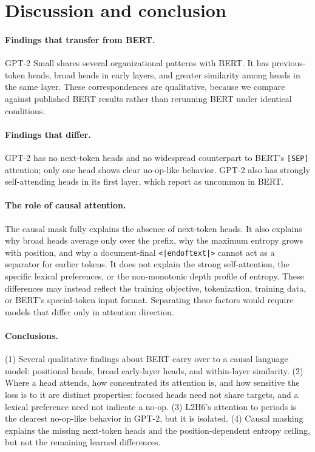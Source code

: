 \documentclass{article}
\newcommand{\SEP}{\texttt{[SEP]}}
\newcommand{\eot}{\texttt{<|endoftext|>}}
\begin{document}
\section{Discussion and conclusion}
\label{sec:discussion}

\paragraph{Findings that transfer from BERT.} GPT-2 Small shares several organizational patterns with BERT. It has previous-token heads, broad heads in early layers, and greater similarity among heads in the same layer. These correspondences are qualitative, because we compare against published BERT results rather than rerunning BERT under identical conditions.

\paragraph{Findings that differ.} GPT-2 has no next-token heads and no widespread counterpart to BERT's \SEP{} attention; only one head shows clear no-op-like behavior. GPT-2 also has strongly self-attending heads in its first layer, which \citeauthor{clark2019} report as uncommon in BERT.

\paragraph{The role of causal attention.} The causal mask fully explains the absence of next-token heads. It also explains why broad heads average only over the prefix, why the maximum entropy grows with position, and why a document-final \eot{} cannot act as a separator for earlier tokens. It does not explain the strong self-attention, the specific lexical preferences, or the non-monotonic depth profile of entropy. These differences may instead reflect the training objective, tokenization, training data, or BERT's special-token input format. Separating these factors would require models that differ only in attention direction.

\paragraph{Conclusions.} (1) Several qualitative findings about BERT carry over to a causal language model: positional heads, broad early-layer heads, and within-layer similarity. (2) Where a head attends, how concentrated its attention is, and how sensitive the loss is to it are distinct properties: focused heads need not share targets, and a lexical preference need not indicate a no-op. (3) L2H6's attention to periods is the clearest no-op-like behavior in GPT-2, but it is isolated. (4) Causal masking explains the missing next-token heads and the position-dependent entropy ceiling, but not the remaining learned differences.
\end{document}
